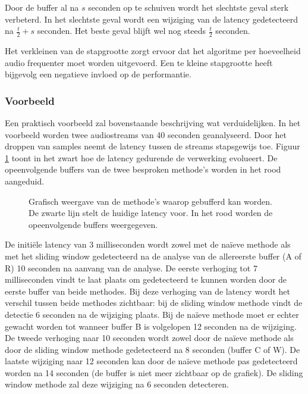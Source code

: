 Door de buffer al na $ s $ seconden op te schuiven wordt het slechtste geval sterk verbeterd. In het slechtste geval wordt een wijziging van de latency gedetecteerd na $ \frac{t}{2} + s $ seconden. Het beste geval blijft wel nog steeds $ \frac{t}{2} $ seconden.

Het verkleinen van de stapgrootte zorgt ervoor dat het algoritme per hoeveelheid audio frequenter moet worden uitgevoerd. Een te kleine stapgrootte heeft bijgevolg een negatieve invloed op de performantie.

\subsubsection{Voorbeeld}

Een praktisch voorbeeld zal bovenstaande beschrijving wat verduidelijken. In het voorbeeld worden twee audiostreams van 40 seconden geanalyseerd. Door het droppen van samples neemt de latency tussen de streams stapsgewijs toe. Figuur \ref{latency} toont in het zwart hoe de latency gedurende de verwerking evolueert. De opeenvolgende buffers van de twee besproken methode's worden in het rood aangeduid. 

\begin{figure}[h!]
	\captionsetup{width=0.7\textwidth}
	\caption[Voorbeeld buffering methodes]{Grafisch weergave van de methode's waarop gebufferd kan worden. De zwarte lijn stelt de huidige latency voor. In het rood worden de opeenvolgende buffers weergegeven.}
	\begin{center}
		\advance\parskip0.3cm
		
	\end{center}
	\label{latency}
\end{figure}

De initiële latency van 3 milliseconden wordt zowel met de naïeve methode als met het sliding window gedetecteerd na de analyse van de allereerste buffer (A of R) 10 seconden na aanvang van de analyse. De eerste verhoging tot 7 milliseconden vindt te laat plaats om gedetecteerd te kunnen worden door de eerste buffer van beide methodes. Bij deze verhoging van de latency wordt het verschil tussen beide methodes zichtbaar: bij  de sliding window methode vindt de detectie 6 seconden na de wijziging plaats. Bij de naïeve methode moet er echter gewacht worden tot wanneer buffer B is volgelopen 12 seconden na de wijziging. De tweede verhoging naar 10 seconden wordt zowel door de naïeve methode als door de sliding window methode gedetecteerd na 8 seconden (buffer C of W). De laatste wijziging naar 12 seconden kan door de naïeve methode pas gedetecteerd worden na 14 seconden (de buffer is niet meer zichtbaar op de grafiek). De sliding window methode zal deze wijziging na 6 seconden detecteren.

